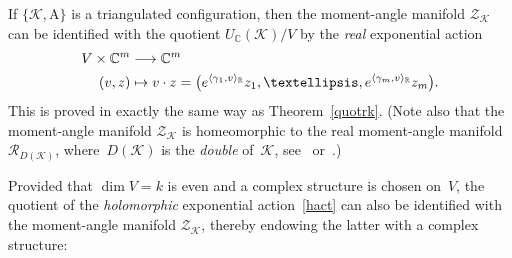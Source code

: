 \documentclass[a4paper]{amsart}
\theoremstyle{definition}
\theoremstyle{remark}
\numberwithin{equation}{section}
\def\R{\mathbb R}
\def\C{\mathbb C}
\def\R{\mathbb R}
\def\sK{\mathcal K}
\newcommand{\mb}[1]{{\textbf {\textit#1}}}
\newcommand{\zk}{\mathcal Z_{\mathcal K}}
\newcommand{\<}{\langle}
\renewcommand{\>}{\rangle}
\begin{document}
If $\{\sK,\mathrm A\}$ is a triangulated configuration, then the moment-angle manifold $\zk$ can be identified with the quotient $U_\C(\sK)/V$ by the \emph{real} exponential action
\begin{equation}\label{ractz}
\begin{aligned}
  V\times\C^m&\longrightarrow\C^m\\
  (\mb v,\mb z)&\mapsto \mb v\cdot\mb z=\bigl(e^{\langle\gamma_1,\mb
  v\rangle_\R}z_1,\ldots,e^{\langle\gamma_m,\mb v\rangle_\R}z_m\bigr).
\end{aligned}
\end{equation}
This is proved in exactly the same way as Theorem~\ref{quotrk}. (Note also that the moment-angle manifold $\zk$ is homeomorphic to the real moment-angle manifold $\mathcal R_{D(\sK)}$, where~$D(\sK)$ is the \emph{double} of~$\sK$, see~\cite{b-b-c-g15} or~\cite[Corollary~4.8.14]{bu-pa15}.)

Provided that $\dim V=k$ is even and a complex structure is chosen on~$V$, the quotient of the \emph{holomorphic} exponential action~\eqref{hact} can also be identified with the moment-angle manifold $\zk$, thereby endowing the latter with a complex structure:
\end{document}
